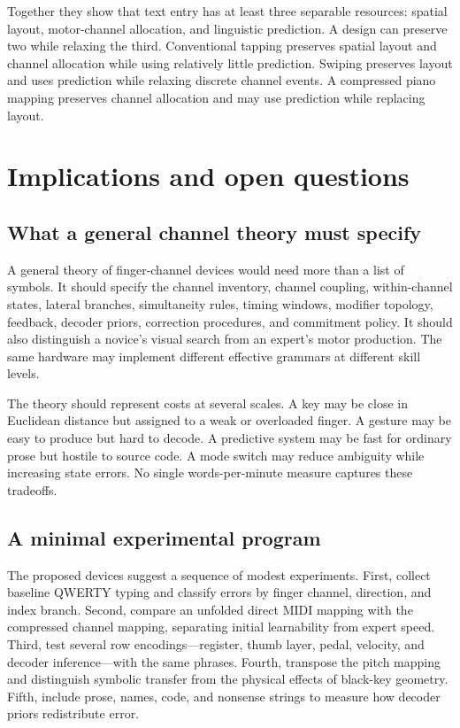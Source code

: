 \documentclass[11pt]{article}
\begin{document}
Together they show that text entry has at least three separable resources: spatial layout, motor-channel allocation, and linguistic prediction. A design can preserve two while relaxing the third. Conventional tapping preserves spatial layout and channel allocation while using relatively little prediction. Swiping preserves layout and uses prediction while relaxing discrete channel events. A compressed piano mapping preserves channel allocation and may use prediction while replacing layout.

\section{Implications and open questions}

\subsection{What a general channel theory must specify}

A general theory of finger-channel devices would need more than a list of symbols. It should specify the channel inventory, channel coupling, within-channel states, lateral branches, simultaneity rules, timing windows, modifier topology, feedback, decoder priors, correction procedures, and commitment policy. It should also distinguish a novice's visual search from an expert's motor production. The same hardware may implement different effective grammars at different skill levels.

The theory should represent costs at several scales. A key may be close in Euclidean distance but assigned to a weak or overloaded finger. A gesture may be easy to produce but hard to decode. A predictive system may be fast for ordinary prose but hostile to source code. A mode switch may reduce ambiguity while increasing state errors. No single words-per-minute measure captures these tradeoffs.

\subsection{A minimal experimental program}

The proposed devices suggest a sequence of modest experiments. First, collect baseline QWERTY typing and classify errors by finger channel, direction, and index branch. Second, compare an unfolded direct MIDI mapping with the compressed channel mapping, separating initial learnability from expert speed. Third, test several row encodings---register, thumb layer, pedal, velocity, and decoder inference---with the same phrases. Fourth, transpose the pitch mapping and distinguish symbolic transfer from the physical effects of black-key geometry. Fifth, include prose, names, code, and nonsense strings to measure how decoder priors redistribute error.
\end{document}
